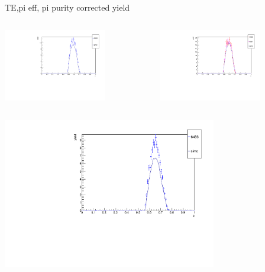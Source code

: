 \begin{frame}{TE,pi eff, pi purity corrected yield}
\begin{columns}
\begin{column}[T]{0.5\textwidth}
\includegraphics[width = 0.7\textwidth]{results/yield/check/yieldcheck_330_neg.pdf}
\end{column}
\begin{column}[T]{0.5\textwidth}
\includegraphics[width = 0.7\textwidth]{results/yield/check/yieldcheck_330_pos.pdf}
\end{column}
\end{columns}
\begin{columns}
\begin{column}[T]{0.5\textwidth}
\includegraphics[width = 0.7\textwidth]{results/yield/check/yieldcheck_320_neg.pdf}

\end{column}
\end{columns}
\end{frame}
